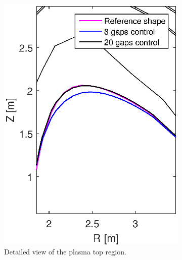 \begin{figure}
\begin{subfigure}[b]{0.32\textwidth}
		\includegraphics[width=\textwidth]{Chp3/zoom_Ref_20gaps_8gaps_minor_top_2.eps} 
		\caption{Detailed view of the plasma top region.\label{figure:minor_big}}
	\end{subfigure}
	~
	\begin{subfigure}[b]{0.32\textwidth}

\end{subfigure}
\end{figure}
